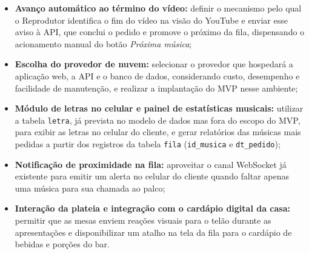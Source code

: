 \begin{itemize}
  \item \textbf{Avanço automático ao término do vídeo:} definir o mecanismo pelo qual o Reprodutor identifica o fim do vídeo na visão do YouTube e enviar esse aviso à API, que conclui o pedido e promove o próximo da fila, dispensando o acionamento manual do botão \textit{Próxima música};
  \item \textbf{Escolha do provedor de nuvem:} selecionar o provedor que hospedará a aplicação web, a API e o banco de dados, considerando custo, desempenho e facilidade de manutenção, e realizar a implantação do MVP nesse ambiente;
  \item \textbf{Módulo de letras no celular e painel de estatísticas musicais:} utilizar a tabela \texttt{letra}, já prevista no modelo de dados mas fora do escopo do MVP, para exibir as letras no celular do cliente, e gerar relatórios das músicas mais pedidas a partir dos registros da tabela \texttt{fila} (\texttt{id\_musica} e \texttt{dt\_pedido});
  \item \textbf{Notificação de proximidade na fila:} aproveitar o canal WebSocket já existente para emitir um alerta no celular do cliente quando faltar apenas uma música para sua chamada ao palco;
  \item \textbf{Interação da plateia e integração com o cardápio digital da casa:} permitir que as mesas enviem reações visuais para o telão durante as apresentações e disponibilizar um atalho na tela da fila para o cardápio de bebidas e porções do bar.
\end{itemize}
